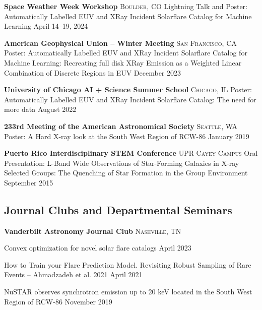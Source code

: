 \documentclass[11pt,a4paper]{article}
\begin{document}
\headedsection
{\textbf{Space Weather Week Workshop}}
{\textsc{Boulder, CO}}
{%
    \headedsubsection
    {Lightning Talk and Poster: Automatically Labelled EUV and XRay Incident Solarflare Catalog for Machine Learning}
    {April 14–19, 2024}
    {}
}

\headedsection
{\textbf{American Geophysical Union -- Winter Meeting}}
{\textsc{San Francisco, CA}}
{%
    \headedsubsection
    {Poster: Automatically Labelled EUV and XRay Incident Solarflare Catalog for Machine Learning: Recreating full disk XRay Emission as a Weighted Linear Combination of Discrete Regions in EUV}
    {December 2023}
    {}
}

\headedsection
{\textbf{University of Chicago AI + Science Summer School}}
{\textsc{Chicago, IL}}
{%
    \headedsubsection
    {Poster: Automatically Labelled EUV and XRay Incident Solarflare Catalog: The need for more data}
    {August 2022}
    {}
}

\headedsection
{\textbf{233rd Meeting of the American Astronomical Society}}
{\textsc{Seattle, WA}}
{%
    \headedsubsection
    {Poster: A Hard X-ray look at the South West Region of RCW-86}
    {January 2019}
    {}
}

\headedsection
{\textbf{Puerto Rico Interdisciplinary STEM Conference}}
{\textsc{UPR-Cayey Campus}}
{%
    \headedsubsection
    {Oral Presentation: L-Band Wide Observations of Star-Forming Galaxies in X-ray Selected Groups: The Quenching of Star Formation in the Group Environment}
    {September 2015}
    {}
}

\subsection*{Journal Clubs and Departmental Seminars}

\headedsection
{\textbf{Vanderbilt Astronomy Journal Club}}
{\textsc{Nashville, TN}}
{%
    \headedsubsection
    {Convex optimization for novel solar flare catalogs}
    {April 2023}
    {}
    
    \headedsubsection
    {How to Train your Flare Prediction Model. Revisiting Robust Sampling of Rare Events -- Ahmadzadeh et al. 2021}
    {April 2021}
    {}
    
    \headedsubsection
    {NuSTAR observes synchrotron emission up to 20 keV located in the South West Region of RCW-86}
    {November 2019}
    {}
}
\end{document}
